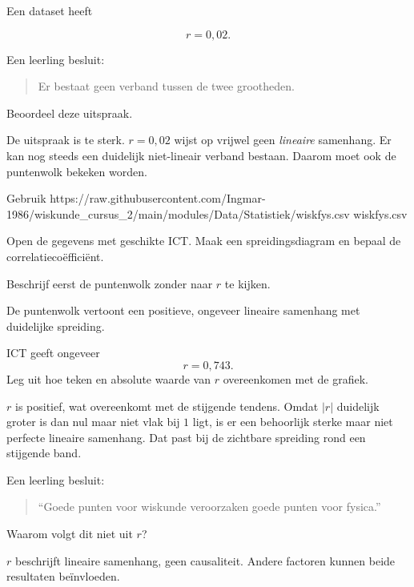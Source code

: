 \documentclass{ximera}
\begin{document}
\begin{oefening}{\oefB \ESS}

Een dataset heeft

\[
r=0{,}02.
\]

Een leerling besluit:

\begin{quote}
Er bestaat geen verband tussen de twee grootheden.
\end{quote}

Beoordeel deze uitspraak.

\begin{oplossing}
De uitspraak is te sterk. $r=0{,}02$ wijst op vrijwel geen
\emph{lineaire} samenhang. Er kan nog steeds een duidelijk niet-lineair
verband bestaan. Daarom moet ook de puntenwolk bekeken worden.
\end{oplossing}
\end{oefening}





\begin{oefening}{\oefU \ESS}

Gebruik \csv
{https://raw.githubusercontent.com/Ingmar-1986/wiskunde_cursus_2/main/modules/Data/Statistiek/wiskfys.csv}
{wiskfys.csv}

Open de gegevens met geschikte ICT. Maak een spreidingsdiagram en
bepaal de correlatiecoëfficiënt.

\begin{question}
Beschrijf eerst de puntenwolk zonder naar $r$ te kijken.

\begin{oplossing}
De puntenwolk vertoont een positieve, ongeveer lineaire samenhang met
duidelijke spreiding.
\end{oplossing}
\end{question}

\begin{question}
ICT geeft ongeveer
\[
r=0{,}743.
\]
Leg uit hoe teken en absolute waarde van $r$ overeenkomen met de grafiek.

\begin{oplossing}
$r$ is positief, wat overeenkomt met de stijgende tendens.
Omdat $|r|$ duidelijk groter is dan nul maar niet vlak bij $1$ ligt,
is er een behoorlijk sterke maar niet perfecte lineaire samenhang.
Dat past bij de zichtbare spreiding rond een stijgende band.
\end{oplossing}
\end{question}

\begin{question}
Een leerling besluit:
\begin{quote}
``Goede punten voor wiskunde veroorzaken goede punten voor fysica.''
\end{quote}
Waarom volgt dit niet uit $r$?

\begin{oplossing}
$r$ beschrijft lineaire samenhang, geen causaliteit. Andere factoren
kunnen beide resultaten beïnvloeden.
\end{oplossing}
\end{question}

\end{oefening}
\end{document}
